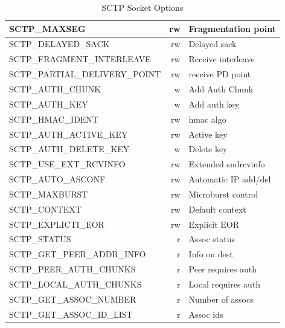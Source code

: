 \documentclass[conference]{IEEEtran}
\begin{document}
\begin{table}[h]
\begin{center}
\begin{tabular}{|l|r|l|}
SCTP\_MAXSEG                    & rw  & Fragmentation point      \\\hline
SCTP\_DELAYED\_SACK             & rw  & Delayed sack             \\\hline
SCTP\_FRAGMENT\_INTERLEAVE      & rw  & Receive interleave       \\\hline
SCTP\_PARTIAL\_DELIVERY\_POINT  & rw  & receive PD point         \\\hline
SCTP\_AUTH\_CHUNK               & w   & Add Auth Chunk           \\\hline
SCTP\_AUTH\_KEY                 & w   & Add auth key             \\\hline
SCTP\_HMAC\_IDENT               & rw  & hmac algo                \\\hline
SCTP\_AUTH\_ACTIVE\_KEY         & rw  & Active key               \\\hline
SCTP\_AUTH\_DELETE\_KEY         & w   & Delete key               \\\hline
SCTP\_USE\_EXT\_RCVINFO         & rw  & Extended sndrcvinfo      \\\hline
SCTP\_AUTO\_ASCONF              & rw  & Automatic IP add/del     \\\hline
SCTP\_MAXBURST                  & rw  & Microburst control       \\\hline
SCTP\_CONTEXT                   & rw  & Default context          \\\hline
SCTP\_EXPLICTI\_EOR             & rw  & Explicit EOR             \\\hline
SCTP\_STATUS                    & r   & Assoc status             \\\hline
SCTP\_GET\_PEER\_ADDR\_INFO     & r   & Info on dest             \\\hline
SCTP\_PEER\_AUTH\_CHUNKS        & r   & Peer requires auth       \\\hline
SCTP\_LOCAL\_AUTH\_CHUNKS       & r   & Local requires auth      \\\hline
SCTP\_GET\_ASSOC\_NUMBER        & r   & Number of assocs         \\\hline
SCTP\_GET\_ASSOC\_ID\_LIST      & r   & Assoc ids                \\\hline
\end{tabular}
\end{center}
\caption{SCTP Socket Options\label{sockopt}}
\end{table}
\end{document}
